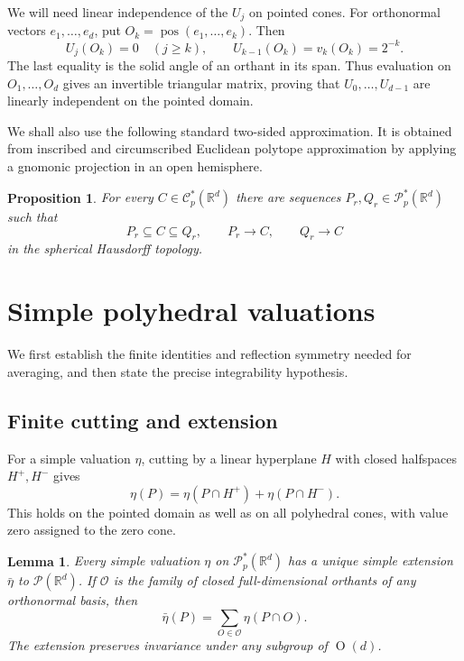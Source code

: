 \documentclass[11pt]{article}
\newcommand{\R}{\mathbb{R}}
\newcommand{\CC}{\mathcal{C}}
\newcommand{\PP}{\mathcal{P}}
\newcommand{\On}[1]{\operatorname{O}(#1)}
\newcommand{\pos}{\operatorname{pos}}
\theoremstyle{plain}
\newtheorem{proposition}[theorem]{Proposition}
\newtheorem{lemma}[theorem]{Lemma}
\theoremstyle{definition}
\begin{document}
We will need linear independence of the $U_j$ on pointed cones. For orthonormal vectors $e_1,\ldots,e_d$, put
$O_k=\pos(e_1,\ldots,e_k)$.  Then
\begin{equation}\label{eq:orthant-triangular}
  U_j(O_k)=0\quad(j\ge k),\qquad
  U_{k-1}(O_k)=v_k(O_k)=2^{-k}.
\end{equation}
The last equality is the solid angle of an orthant in its span.
Thus evaluation on $O_1,\ldots,O_d$ gives an invertible triangular
matrix, proving that $U_0,\ldots,U_{d-1}$ are linearly independent on
the pointed domain.

We shall also use the following standard two-sided approximation.  It is
obtained from inscribed and circumscribed Euclidean polytope approximation
\cite[Section~1.8]{Sch14:Convex-Bodies} by applying a gnomonic projection
\cite[Section~3.2]{Sch22:Convex-Cones} in an open
hemisphere.

\begin{proposition}\label{prop:polyhedral-sandwich}
For every $C\in\CC_p^*(\R^d)$ there are sequences
$P_r,Q_r\in\PP_p^*(\R^d)$ such that
\begin{equation*}
  P_r\subseteq C\subseteq Q_r,
  \qquad P_r\rightarrow C,
  \qquad Q_r\rightarrow C
\end{equation*}
in the spherical Hausdorff topology.
\end{proposition}

\section{Simple polyhedral valuations}\label{sec:simple-polyhedral}

We first establish the finite identities and reflection symmetry needed
for averaging, and then state the precise integrability hypothesis.

\subsection{Finite cutting and extension}

For a simple valuation $\eta$, cutting by a linear hyperplane $H$ with
closed halfspaces $H^+,H^-$ gives
\begin{equation}\label{eq:simple-cut}
  \eta(P)=\eta(P\cap H^+)+\eta(P\cap H^-).
\end{equation}
This holds on the pointed domain as well as on all polyhedral cones,
with value zero assigned to the zero cone.

\begin{lemma}\label{lem:simple-extension}
Every simple valuation $\eta$ on $\PP_p^*(\R^d)$ has a unique simple
extension $\bar\eta$ to $\PP(\R^d)$.  If $\mathcal O$ is the family of
closed full-dimensional orthants of any orthonormal basis, then
\begin{equation}\label{eq:orthant-extension}
  \bar\eta(P)=\sum_{O\in\mathcal O}\eta(P\cap O).
\end{equation}
The extension preserves invariance under any subgroup of $\On d$.
\end{lemma}
\end{document}

